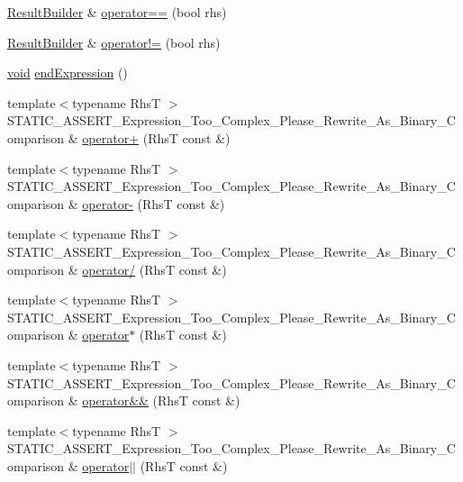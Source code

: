 \begin{DoxyCompactItemize}
\item 
\hyperlink{class_catch_1_1_result_builder}{Result\+Builder} \& \hyperlink{class_catch_1_1_expression_lhs_a6001030bcfbabc3981013ddffb3e3bb6}{operator==} (bool rhs)
\item 
\hyperlink{class_catch_1_1_result_builder}{Result\+Builder} \& \hyperlink{class_catch_1_1_expression_lhs_a71e48da9a894962e8b32a8af5359a4df}{operator!=} (bool rhs)
\item 
\hyperlink{_s_d_l__opengles2__gl2ext_8h_ae5d8fa23ad07c48bb609509eae494c95}{void} \hyperlink{class_catch_1_1_expression_lhs_a13d2551a927790284fb5ddf1ee2c9079}{end\+Expression} ()
\item 
{\footnotesize template$<$typename RhsT $>$ }\\S\+T\+A\+T\+I\+C\+\_\+\+A\+S\+S\+E\+R\+T\+\_\+\+Expression\+\_\+\+Too\+\_\+\+Complex\+\_\+\+Please\+\_\+\+Rewrite\+\_\+\+As\+\_\+\+Binary\+\_\+\+Comparison \& \hyperlink{class_catch_1_1_expression_lhs_a29ffb8417e977f0a98c0eb537a7ca5af}{operator+} (RhsT const \&)
\item 
{\footnotesize template$<$typename RhsT $>$ }\\S\+T\+A\+T\+I\+C\+\_\+\+A\+S\+S\+E\+R\+T\+\_\+\+Expression\+\_\+\+Too\+\_\+\+Complex\+\_\+\+Please\+\_\+\+Rewrite\+\_\+\+As\+\_\+\+Binary\+\_\+\+Comparison \& \hyperlink{class_catch_1_1_expression_lhs_a19ef0a33442bb18efef1ec65102151d1}{operator-\/} (RhsT const \&)
\item 
{\footnotesize template$<$typename RhsT $>$ }\\S\+T\+A\+T\+I\+C\+\_\+\+A\+S\+S\+E\+R\+T\+\_\+\+Expression\+\_\+\+Too\+\_\+\+Complex\+\_\+\+Please\+\_\+\+Rewrite\+\_\+\+As\+\_\+\+Binary\+\_\+\+Comparison \& \hyperlink{class_catch_1_1_expression_lhs_a37d50565046ac9b1c9159a7c0cf88a1e}{operator/} (RhsT const \&)
\item 
{\footnotesize template$<$typename RhsT $>$ }\\S\+T\+A\+T\+I\+C\+\_\+\+A\+S\+S\+E\+R\+T\+\_\+\+Expression\+\_\+\+Too\+\_\+\+Complex\+\_\+\+Please\+\_\+\+Rewrite\+\_\+\+As\+\_\+\+Binary\+\_\+\+Comparison \& \hyperlink{class_catch_1_1_expression_lhs_a9a94294c22449f62087862ef911e6291}{operator$\ast$} (RhsT const \&)
\item 
{\footnotesize template$<$typename RhsT $>$ }\\S\+T\+A\+T\+I\+C\+\_\+\+A\+S\+S\+E\+R\+T\+\_\+\+Expression\+\_\+\+Too\+\_\+\+Complex\+\_\+\+Please\+\_\+\+Rewrite\+\_\+\+As\+\_\+\+Binary\+\_\+\+Comparison \& \hyperlink{class_catch_1_1_expression_lhs_a7f022056ef4f25e716ab85846be6229f}{operator\&\&} (RhsT const \&)
\item 
{\footnotesize template$<$typename RhsT $>$ }\\S\+T\+A\+T\+I\+C\+\_\+\+A\+S\+S\+E\+R\+T\+\_\+\+Expression\+\_\+\+Too\+\_\+\+Complex\+\_\+\+Please\+\_\+\+Rewrite\+\_\+\+As\+\_\+\+Binary\+\_\+\+Comparison \& \hyperlink{class_catch_1_1_expression_lhs_a6932b72da79d6c6b03d867772ceac61b}{operator$\vert$$\vert$} (RhsT const \&)
\end{DoxyCompactItemize}



